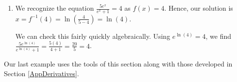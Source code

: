 \documentclass{ximera}
\begin{document}
\begin{example}
\begin{explanation}
\begin{enumerate}


\item We recognize the equation $\frac{5e^{x}}{e^{x}+1} = 4$ as $f(x) = 4$.  Hence, our solution is $x = f^{-1}(4) = \ln\left(\frac{4}{5-4}\right) = \ln(4)$.  

We can check this fairly quickly algebraically.  Using  $e^{\ln(4)} = 4$, we find $\frac{5e^{\ln(4)}}{e^{\ln(4)}+1}  = \frac{5(4)}{4+1} = \frac{20}{5} = 4$. 
\end{enumerate}
\end{explanation}
\end{example}

Our last example uses the tools of this section along with those developed in Section \ref{AppDerivatives}.
\end{document}
